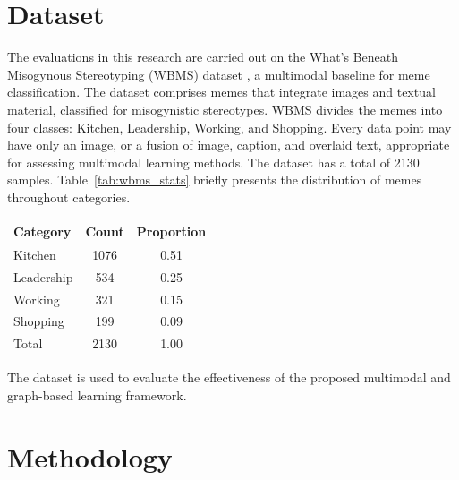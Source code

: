 \documentclass[a4paper]{cas-sc}
\begin{document}
\section{Dataset}

The evaluations in this research are carried out on the What’s Beneath Misogynous Stereotyping (WBMS) dataset \cite{kanwar2025wbms}, a multimodal baseline for meme classification. The dataset comprises memes that integrate images and textual material, classified for misogynistic stereotypes. WBMS divides the memes into four classes: Kitchen, Leadership, Working, and Shopping. Every data point may have only an image, or a fusion of image, caption, and overlaid text, appropriate for assessing multimodal learning methods. The dataset has a total of 2130 samples. Table~\ref{tab:wbms_stats} briefly presents the distribution of memes throughout categories.

\begin{center}
\begin{minipage}{\linewidth}
\centering
{}
\label{tab:wbms_stats}

\begin{tabular}{lcc}
\hline
\textbf{Category} & \textbf{Count} & \textbf{Proportion} \\
\hline
Kitchen & 1076 & 0.51 \\
Leadership & 534 & 0.25 \\
Working & 321 & 0.15 \\
Shopping & 199 & 0.09 \\
\hline
Total & 2130 & 1.00 \\
\hline
\end{tabular}
\end{minipage}
\end{center}

The dataset is used to evaluate the effectiveness of the proposed multimodal and graph-based learning framework.



\section{Methodology}
\end{document}
